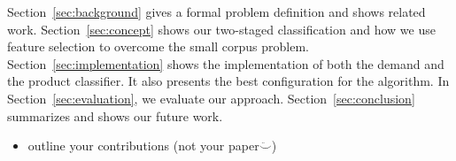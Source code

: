 Section~\ref{sec:background} gives a formal problem definition and shows related work.
Section~\ref{sec:concept} shows our two-staged classification and how we use feature selection to overcome the small corpus problem.
Section~\ref{sec:implementation} shows the implementation of both the demand and the product classifier.
It also presents the best configuration for the algorithm.
In Section~\ref{sec:evaluation}, we evaluate our approach.
Section~\ref{sec:conclusion} summarizes and shows our future work.

\begin{itemize}
	\item outline your contributions (not your paper$\ddot\smile$)
\end{itemize}
